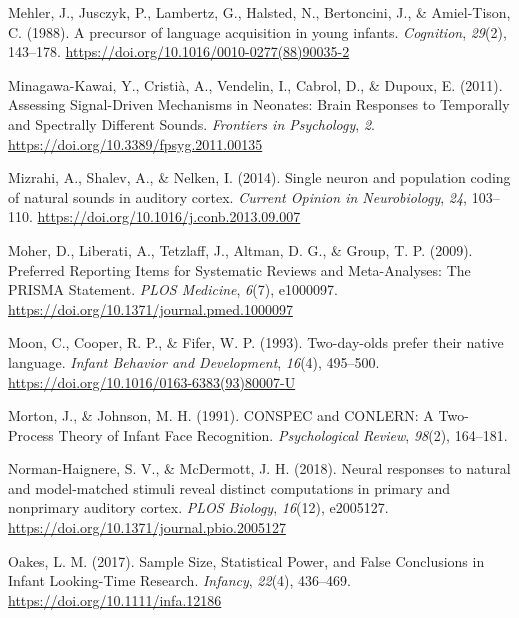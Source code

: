 \documentclass[
  man]{apa6}
\begin{document}
\leavevmode\hypertarget{ref-mehler_precursor_1988}{}%
Mehler, J., Jusczyk, P., Lambertz, G., Halsted, N., Bertoncini, J., \& Amiel-Tison, C. (1988). A precursor of language acquisition in young infants. \emph{Cognition}, \emph{29}(2), 143--178. \url{https://doi.org/10.1016/0010-0277(88)90035-2}

\leavevmode\hypertarget{ref-minagawa-kawai_assessing_2011}{}%
Minagawa-Kawai, Y., Cristià, A., Vendelin, I., Cabrol, D., \& Dupoux, E. (2011). Assessing Signal-Driven Mechanisms in Neonates: Brain Responses to Temporally and Spectrally Different Sounds. \emph{Frontiers in Psychology}, \emph{2}. \url{https://doi.org/10.3389/fpsyg.2011.00135}

\leavevmode\hypertarget{ref-mizrahi_single_2014}{}%
Mizrahi, A., Shalev, A., \& Nelken, I. (2014). Single neuron and population coding of natural sounds in auditory cortex. \emph{Current Opinion in Neurobiology}, \emph{24}, 103--110. \url{https://doi.org/10.1016/j.conb.2013.09.007}

\leavevmode\hypertarget{ref-moher_preferred_2009}{}%
Moher, D., Liberati, A., Tetzlaff, J., Altman, D. G., \& Group, T. P. (2009). Preferred Reporting Items for Systematic Reviews and Meta-Analyses: The PRISMA Statement. \emph{PLOS Medicine}, \emph{6}(7), e1000097. \url{https://doi.org/10.1371/journal.pmed.1000097}

\leavevmode\hypertarget{ref-moon_two-day-olds_1993}{}%
Moon, C., Cooper, R. P., \& Fifer, W. P. (1993). Two-day-olds prefer their native language. \emph{Infant Behavior and Development}, \emph{16}(4), 495--500. \url{https://doi.org/10.1016/0163-6383(93)80007-U}

\leavevmode\hypertarget{ref-morton_conspec_1991}{}%
Morton, J., \& Johnson, M. H. (1991). CONSPEC and CONLERN: A Two-Process Theory of Infant Face Recognition. \emph{Psychological Review}, \emph{98}(2), 164--181.

\leavevmode\hypertarget{ref-norman-haignere_neural_2018}{}%
Norman-Haignere, S. V., \& McDermott, J. H. (2018). Neural responses to natural and model-matched stimuli reveal distinct computations in primary and nonprimary auditory cortex. \emph{PLOS Biology}, \emph{16}(12), e2005127. \url{https://doi.org/10.1371/journal.pbio.2005127}

\leavevmode\hypertarget{ref-oakes_sample_2017}{}%
Oakes, L. M. (2017). Sample Size, Statistical Power, and False Conclusions in Infant Looking-Time Research. \emph{Infancy}, \emph{22}(4), 436--469. \url{https://doi.org/10.1111/infa.12186}
\end{document}

